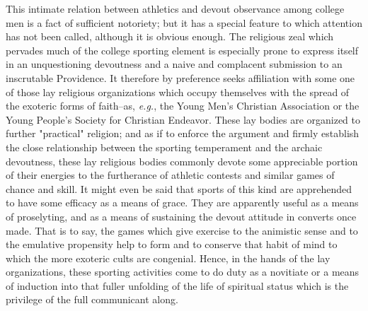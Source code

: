\documentclass[12pt]{report}
\begin{document}
This intimate relation between athletics and devout observance among
college men is a fact of sufficient notoriety; but it has a special
feature to which attention has not been called, although it is obvious
enough. The religious zeal which pervades much of the college sporting
element is especially prone to express itself in an unquestioning
devoutness and a naive and complacent submission to an inscrutable
Providence. It therefore by preference seeks affiliation with some one
of those lay religious organizations which occupy themselves with
the spread of the exoteric forms of faith--as, \emph{e.g.}, the Young Men's
Christian Association or the Young People's Society for Christian
Endeavor. These lay bodies are organized to further "practical"
religion; and as if to enforce the argument and firmly establish the
close relationship between the sporting temperament and the archaic
devoutness, these lay religious bodies commonly devote some appreciable
portion of their energies to the furtherance of athletic contests and
similar games of chance and skill. It might even be said that sports
of this kind are apprehended to have some efficacy as a means of grace.
They are apparently useful as a means of proselyting, and as a means of
sustaining the devout attitude in converts once made. That is to
say, the games which give exercise to the animistic sense and to the
emulative propensity help to form and to conserve that habit of mind to
which the more exoteric cults are congenial. Hence, in the hands of
the lay organizations, these sporting activities come to do duty as a
novitiate or a means of induction into that fuller unfolding of the
life of spiritual status which is the privilege of the full communicant
along.
\end{document}
